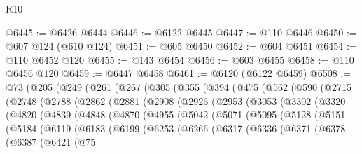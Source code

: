 \begin{lexlean}{R10}
\begin{coremodule}
{{{{{{{{{{{{{{{{{{{{{{{{{{{{{{{{{{{{{{{{{{{{{{{{{{{{{{{{{{{{{{{{{{{{{{{{{{{{{{{{{{{{@6445 := @6426 @6444
@6446 := @6122 @6445
@6447 := @110 @6446
@6450 := @607 @124 (@610 @124)
@6451 := @605 @6450
@6452 := @604 @6451
@6454 := @110 @6452 @120
@6455 := @143 @6454
@6456 := @603 @6455
@6458 := @110 @6456 @120
@6459 := @6447 @6458
@6461 := @6120 (@6122 @6459)
@6508 := @73
    (@205
      (@249
        (@261
          (@267
            (@305
              (@355
                (@394
                  (@475
                    (@562
                      (@590
                        (@2715
                          (@2748
                            (@2788
                              (@2862
                                (@2881
                                  (@2908
                                    (@2926
                                      (@2953
                                        (@3053
                                          (@3302
                                            (@3320
                                              (@4820
                                                (@4839
                                                  (@4848
                                                    (@4870
                                                      (@4955
                                                        (@5042
                                                          (@5071
                                                            (@5095
                                                              (@5128
                                                                (@5151
                                                                  (@5184
                                                                    (@6119
                                                                      (@6183
                                                                        (@6199
                                                                          (@6253
                                                                            (@6266
                                                                              (@6317
                                                                                (@6336
                                                                                  (@6371
                                                                                    (@6378
                                                                                      (@6387
                                                                                        (@6421
                                                                                          (@75
}}}}}}}}}}}}}}}}}}}}}}}}}}}}}}}}}}}}}}}}}}}}}}}}}}}}}}}}}}}}}}}}}}}}}}}}}}}}}}}}}}}}
\end{coremodule}
\end{lexlean}
